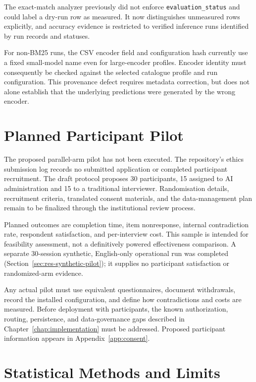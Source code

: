 The exact-match analyzer previously did not enforce
\texttt{evaluation\_status} and could label a dry-run row as measured. It
now distinguishes unmeasured rows explicitly, and accuracy evidence is
restricted to verified inference runs identified by run records and
statuses.

For non-BM25 runs, the CSV encoder field and configuration hash currently
use a fixed small-model name even for large-encoder profiles. Encoder
identity must consequently be checked against the selected catalogue
profile and run configuration. This provenance defect requires metadata
correction, but does not alone establish that the underlying predictions
were generated by the wrong encoder.

\section{Planned Participant Pilot}
\label{sec:eval-pilot}

The proposed parallel-arm pilot has not been executed. The repository's
ethics submission log records no submitted application or completed
participant recruitment. The draft protocol proposes 30 participants,
15 assigned to AI administration and 15 to a traditional interviewer.
Randomisation details, recruitment criteria, translated consent
materials, and the data-management plan remain to be finalized through
the institutional review process.

Planned outcomes are completion time, item nonresponse, internal
contradiction rate, respondent satisfaction, and per-interview cost.
This sample is intended for feasibility assessment, not a definitively
powered effectiveness comparison. A separate 30-session synthetic,
English-only operational run was completed
(Section~\ref{sec:res-synthetic-pilot}); it supplies no participant
satisfaction or randomized-arm evidence.

Any actual pilot must use equivalent questionnaires, document withdrawals,
record the installed configuration, and define how contradictions and
costs are measured. Before deployment with participants, the known
authorization, routing, persistence, and data-governance gaps described
in Chapter~\ref{chap:implementation} must be addressed. Proposed participant
information appears in Appendix~\ref{app:consent}.

\section{Statistical Methods and Limits}
\label{sec:eval-stats}

